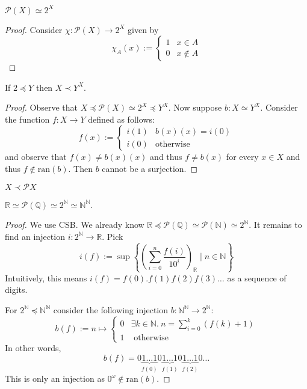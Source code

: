 \documentclass{whrartcl}
\newcommand{\NN}{\mathbb{N}}
\newcommand{\QQ}{\mathbb{Q}}
\newcommand{\RR}{\mathbb{R}}
\newcommand{\pow}{\mathcal{P}}
\newcommand{\ran}{\text{ran}}
\begin{document}
\begin{lemma}
  $\pow(X) \simeq 2^X$
\end{lemma}
\begin{proof}
  Consider $\chi : \pow(X) \to 2^X$ given by
  \[
    \chi_A(x) :=
    \begin{cases}
      1 & x \in A \\
      0 & x \not\in A
    \end{cases}
  \]
\end{proof}

\begin{lemma}
  If $2 \preceq Y$ then $X \prec Y^X$.
\end{lemma}
\begin{proof}
  Observe that $X \preceq \pow(X) \simeq 2^X \preceq Y^X$. Now suppose $b : X \simeq
  Y^X$. Consider the function $f : X \to Y$ defined as follows:
  \[
    f(x) :=
    \begin{cases}
      i(1) & b(x)(x) = i(0) \\
      i(0) & \text{otherwise}
    \end{cases}
  \]
  and observe that $f(x) \neq b(x)(x)$ and thus $f \neq b(x)$ for every $x \in
  X$ and thus $f \not\in \ran(b)$. Then $b$ cannot be a surjection.
\end{proof}
\begin{corollary}
  $X \prec \pow{X}$
\end{corollary}

\begin{lemma}
  $\RR \simeq \pow(\QQ) \simeq 2^\NN \simeq \NN^\NN$.
\end{lemma}
\begin{proof}
  We use CSB. We already know $\RR \preceq \pow(\QQ) \simeq \pow(\NN) \simeq
  2^\NN$. It remains to find an injection $i : 2^\NN \to \RR$. Pick
  \[
    i(f) := \sup \left\{\left(\sum_{i = 0}^n \frac{f(i)}{10^i}\right)_\RR \mid n \in \NN\right\}
  \]
  Intuitively, this means $i(f) = f(0).f(1)f(2)f(3)\ldots$ as a sequence of
  digits.

  For $2^\NN \preceq \NN^\NN$ consider the following injection $b : \NN^\NN \to
  2^\NN$:
  \[
    b(f) := n \mapsto
    \begin{cases}
      0 & \exists k \in \NN.~n = \sum_{i = 0}^k (f(k) + 1) \\
      1 & \text{ otherwise }
    \end{cases}
  \]
  In other words,
  \[
    b(f) = 0 \underbrace{1 \ldots 1}_{f(0)} 0 \underbrace{1 \ldots 1}_{f(1)} 0
    \underbrace{1 \ldots 1}_{f(2)} 0 \ldots
  \]
  This is only an injection as $0^\omega \not\in \ran(b)$.
\end{proof}
\end{document}
